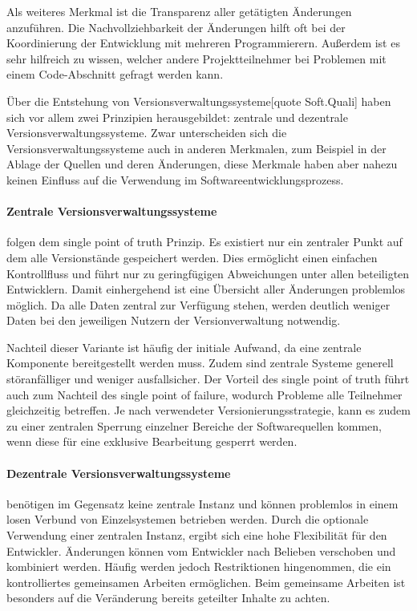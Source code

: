 Als weiteres Merkmal ist die Transparenz aller getätigten Änderungen anzuführen. Die Nachvollziehbarkeit der Änderungen 
hilft oft bei der Koordinierung der Entwicklung mit mehreren Programmierern. Außerdem ist es sehr hilfreich zu wissen, 
welcher andere Projektteilnehmer bei Problemen mit einem Code-Abschnitt gefragt werden kann. 

Über die Entstehung von Versionsverwaltungssysteme[quote Soft.Quali] haben sich vor allem zwei Prinzipien herausgebildet: 
zentrale und dezentrale Versionsverwaltungssysteme. Zwar unterscheiden sich die Versionsverwaltungssysteme auch in 
anderen Merkmalen, zum Beispiel in der Ablage der Quellen und deren Änderungen, diese Merkmale haben aber nahezu keinen 
Einfluss auf die Verwendung im Softwareentwicklungsprozess.

\paragraph{Zentrale Versionsverwaltungssysteme} folgen dem \glqq single point of truth\grqq{} Prinzip. Es existiert nur ein
zentraler Punkt auf dem alle Versionstände gespeichert werden. Dies ermöglicht einen einfachen Kontrollfluss und führt nur zu geringfügigen Abweichungen unter allen beteiligten Entwicklern. Damit einhergehend ist eine Übersicht aller Änderungen problemlos möglich. 
Da alle Daten zentral zur Verfügung stehen, werden deutlich weniger Daten bei den jeweiligen Nutzern der Versionverwaltung notwendig.

Nachteil dieser Variante ist häufig der initiale Aufwand, da eine zentrale Komponente bereitgestellt werden muss. Zudem 
sind zentrale Systeme generell störanfälliger und weniger ausfallsicher. Der Vorteil des \glqq single point of truth\grqq{} führt
auch zum Nachteil des \glqq single point of failure\grqq{}, wodurch Probleme alle Teilnehmer gleichzeitig betreffen.
Je nach verwendeter Versionierungsstrategie, kann es zudem zu einer zentralen Sperrung einzelner Bereiche der Softwarequellen kommen, wenn diese für eine exklusive Bearbeitung gesperrt werden.

\paragraph{Dezentrale Versionsverwaltungssysteme} benötigen im Gegensatz keine zentrale Instanz und können problemlos in 
einem losen Verbund von Einzelsystemen betrieben werden. 
Durch die optionale Verwendung einer zentralen Instanz, ergibt sich eine hohe Flexibilität für den Entwickler. Änderungen 
können vom Entwickler nach Belieben verschoben und kombiniert werden.
Häufig werden jedoch Restriktionen hingenommen, die ein kontrolliertes gemeinsamen Arbeiten ermöglichen. Beim gemeinsame 
Arbeiten ist besonders auf die Veränderung bereits geteilter Inhalte zu achten.
 

